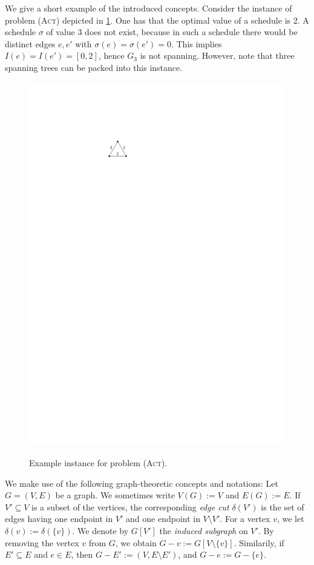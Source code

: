 \documentclass[runningheads]{llncs}
\numberwithin{equation}{section}
\newcommand{\set}[1]{\{ #1 \}}
\newcommand{\act}{\textsc{(Act)}}
\begin{document}
We give a short example of the introduced concepts. Consider the instance of problem {\act} depicted in \cref{fig:introduction_examples}. One has that the optimal value of a schedule is 2. A schedule $\sigma$ of value 3 does not exist, because in such a schedule there would be distinct edges $e, e'$ with $\sigma(e) = \sigma(e') = 0$. This implies $I(e) = I(e') = [0, 2]$, hence $G_3$ is not spanning. However, note that three spanning trees can be packed into this instance.
\begin{figure}
     \centering
         \includegraphics[scale=1]{img/example-act}
         \label{fig:example_act}
        \caption{Example instance for problem {\act}.}
        \label{fig:introduction_examples}
\end{figure}

We make use of the following graph-theoretic concepts and notations: Let $G = (V,E)$ be a graph. We sometimes write $V(G) :=  V$ and $E(G) := E$. If $V' \subseteq V$ is a subset of the vertices, the corresponding \emph{edge cut} $\delta(V')$ is the set of edges having one endpoint in $V'$ and one endpoint in $V \setminus V'$. For a vertex $v$, we let $\delta(v) := \delta(\set{v})$. 
We denote by $G[V']$ the \emph{induced subgraph} on $V'$. By removing the vertex $v$ from $G$, we obtain $G - v := G[V \setminus \set{v}]$. Similarily, if $E' \subseteq E$ and $e \in E$, then $G - E' := (V, E \setminus E')$, and $G - e := G - \set{e}$.
\end{document}
